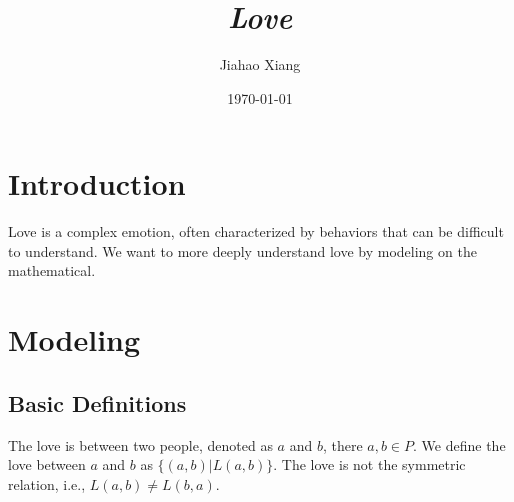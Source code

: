 \documentclass{article}
\title{\textit{Love}}
\author{Jiahao Xiang}
\date{\today}
\begin{document}
\maketitle

\section{Introduction}
Love is a complex emotion, often characterized by behaviors that can be difficult to understand. We want to more deeply understand love by modeling on the mathematical.

\section{Modeling}
\subsection{Basic Definitions}
The love is between two people, denoted as $a$ and $b$, there $a,b\in P$. We define the love between $a$ and $b$ as $\{(a,b)|L(a,b)\}$. The love is not the symmetric relation, i.e., $L(a,b)\neq L(b,a)$.
\end{document}
